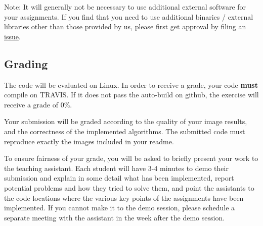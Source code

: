 \documentclass[11pt]{report}
\begin{document}
Note: It will generally not be necessary to use additional external software for your assignments. If you find that you need to use additional binaries / external libraries other than those provided by us, please first get approval by filing an \href{https://github.com/danielepanozzo/cg/issues}{issue}.

\subsection*{Grading}

The code will be evaluated on Linux. In order to receive a grade, your code \textbf{must} compile on TRAVIS. If it does not pass the auto-build on github, the exercise will receive a grade of 0\%. 

Your submission will be graded according to the quality of your image results, and the correctness of the implemented algorithms. The submitted code must reproduce exactly the images included in your readme. 

To ensure fairness of your grade, you will be asked to briefly present your work to the teaching assistant. Each student will have 3-4 minutes to demo their submission and explain in some detail what has been implemented, report potential problems and how they tried to solve them, and point the assistants to the code locations where the various key points of the assignments have been implemented. If you cannot make it to the demo session, please schedule a separate meeting with the assistant in the week after the demo session.
\end{document}
